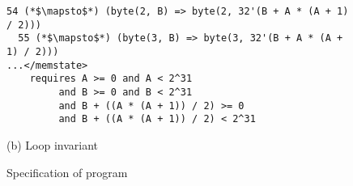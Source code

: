 \begin{figure}[ht]
\begin{lstlisting}[style=KRULE]
  54 (*$\mapsto$*) (byte(2, B) => byte(2, 32'(B + A * (A + 1) / 2)))
  55 (*$\mapsto$*) (byte(3, B) => byte(3, 32'(B + A * (A + 1) / 2)))
...</memstate>
    requires A >= 0 and A < 2^31
         and B >= 0 and B < 2^31
         and B + ((A * (A + 1)) / 2) >= 0  
         and B + ((A * (A + 1)) / 2) < 2^31
\end{lstlisting}
\begin{center}
\vspace{-5pt}
{\small (b) Loop invariant}
\vspace{-5pt}
\end{center}
\caption{Specification of  program}
\label{fig:sum-to-n-spec}
\end{figure}





